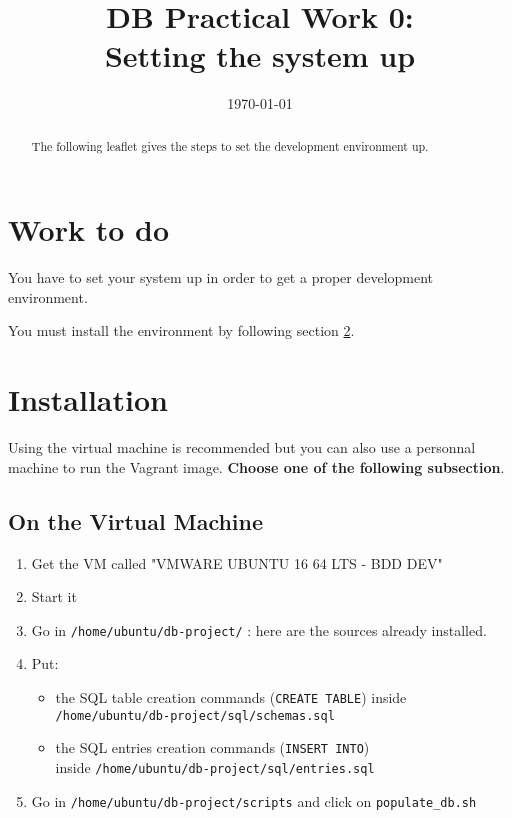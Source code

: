 \documentclass[twoside,a4paper,12pt]{article}
\title{DB Practical Work 0:\\Setting the system up}
\date{\today}
\begin{document}
\maketitle

\begin{abstract}
  The following leaflet gives the steps to set the development environment up.
\end{abstract}

\tableofcontents

\clearpage

\section{Work to do}
You have to set your system up in order to get a proper development environment.

You must install the environment by following section \ref{sec:installation}.

\section{Installation}
\label{sec:installation}

Using the virtual machine is recommended but you can also use a personnal machine to run the Vagrant image. \textbf{Choose one of the following subsection}.

\newpage
\subsection{On the Virtual Machine}
\begin{enumerate}
\item Get the VM called "VMWARE UBUNTU 16 64 LTS - BDD DEV"
\item Start it
\item Go in \texttt{/home/ubuntu/db-project/} : here are the sources already installed.
\item Put:
\begin{itemize}
	\item the SQL table creation commands (\texttt{CREATE TABLE}) inside\\ \texttt{/home/ubuntu/db-project/sql/schemas.sql}
	\item the SQL entries creation commands (\texttt{INSERT INTO})\\ inside \texttt{/home/ubuntu/db-project/sql/entries.sql}
\end{itemize}
\item Go in \texttt{/home/ubuntu/db-project/scripts} and click on \texttt{populate\_db.sh}
\end{enumerate}
\end{document}
